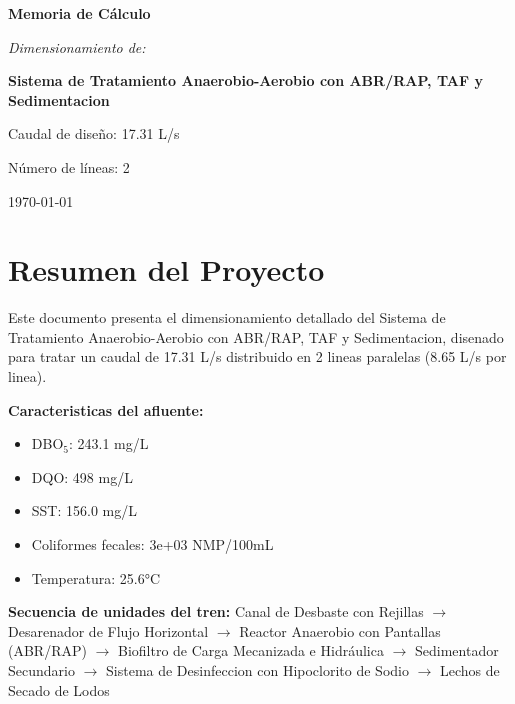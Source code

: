 \documentclass[12pt,a4paper]{article}
\begin{document}
\begin{titlepage}
\centering
\vspace*{2cm}

{\Huge\bfseries Memoria de Cálculo\par}
\vspace{1.5cm}

{\Large\itshape Dimensionamiento de:\par}
\vspace{0.5cm}

{\LARGE\bfseries Sistema de Tratamiento Anaerobio-Aerobio con ABR/RAP, TAF y Sedimentacion\par}
\vspace{2cm}

{\large Caudal de diseño: 17.31 L/s\par}
{\large Número de líneas: 2\par}
\vfill
{\large\today\par}
\end{titlepage}

\tableofcontents

\listoffigures

\listoftables

\newpage
\section{Resumen del Proyecto}

Este documento presenta el dimensionamiento detallado del Sistema de Tratamiento Anaerobio-Aerobio con ABR/RAP, TAF y Sedimentacion, disenado para tratar un caudal de 17.31 L/s distribuido en 2 lineas paralelas (8.65 L/s por linea).

\textbf{Caracteristicas del afluente:}
\begin{itemize}
    \item DBO$_5$: 243.1 mg/L
    \item DQO: 498 mg/L
    \item SST: 156.0 mg/L
    \item Coliformes fecales: 3e+03 NMP/100mL
    \item Temperatura: 25.6°C
\end{itemize}

\textbf{Secuencia de unidades del tren:} 
Canal de Desbaste con Rejillas $\rightarrow$ Desarenador de Flujo Horizontal $\rightarrow$ Reactor Anaerobio con Pantallas (ABR/RAP) $\rightarrow$ Biofiltro de Carga Mecanizada e Hidráulica $\rightarrow$ Sedimentador Secundario $\rightarrow$ Sistema de Desinfeccion con Hipoclorito de Sodio $\rightarrow$ Lechos de Secado de Lodos
\end{document}
